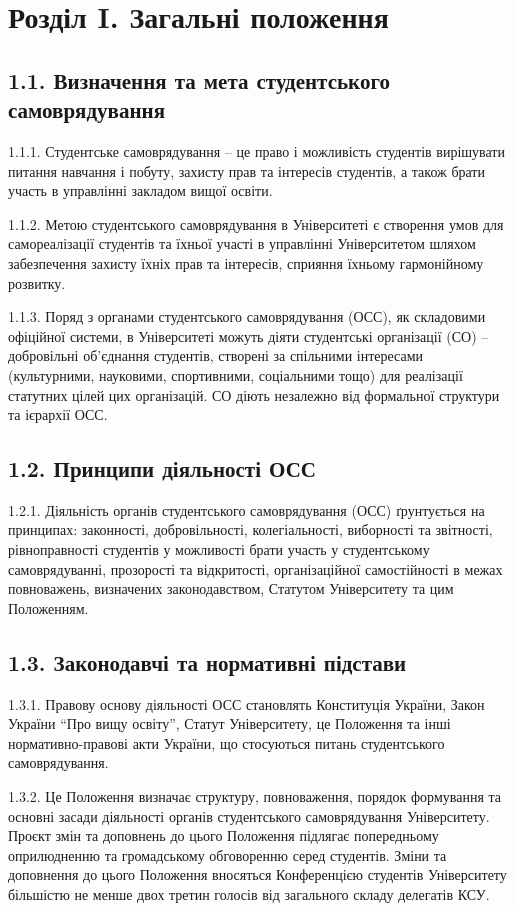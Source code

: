 \section*{Розділ I. Загальні положення}

\subsection*{1.1. Визначення та мета студентського самоврядування}
    1.1.1. Студентське самоврядування -- це право і можливість студентів вирішувати питання навчання і побуту, захисту прав та інтересів студентів, а також брати участь в управлінні закладом вищої освіти.

    1.1.2. Метою студентського самоврядування в Університеті є створення умов для самореалізації студентів та їхньої участі в управлінні Університетом шляхом забезпечення захисту їхніх прав та інтересів, сприяння їхньому гармонійному розвитку.

    1.1.3. Поряд з органами студентського самоврядування (ОСС), як складовими офіційної системи, в Університеті можуть діяти студентські організації (СО) – добровільні об’єднання студентів, створені за спільними інтересами (культурними, науковими, спортивними, соціальними тощо) для реалізації статутних цілей цих організацій. СО діють незалежно від формальної структури та ієрархії ОСС.

\subsection*{1.2. Принципи діяльності ОСС}
    1.2.1. Діяльність органів студентського самоврядування (ОСС) ґрунтується на принципах: законності, добровільності, колегіальності, виборності та звітності, рівноправності студентів у можливості брати участь у студентському самоврядуванні, прозорості та відкритості, організаційної самостійності в межах повноважень, визначених законодавством, Статутом Університету та цим Положенням.

\subsection*{1.3. Законодавчі та нормативні підстави}
    1.3.1. Правову основу діяльності ОСС становлять Конституція України, Закон України ``Про вищу освіту'', Статут Університету, це Положення та інші нормативно-правові акти України, що стосуються питань студентського самоврядування.

    1.3.2. Це Положення визначає структуру, повноваження, порядок формування та основні засади діяльності органів студентського самоврядування Університету. Проєкт змін та доповнень до цього Положення підлягає попередньому оприлюдненню та громадському обговоренню серед студентів. Зміни та доповнення до цього Положення вносяться Конференцією студентів Університету більшістю не менше двох третин голосів від загального складу делегатів КСУ.

